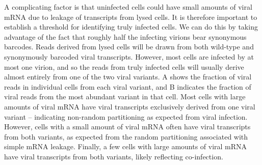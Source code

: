 \documentclass[9pt,lineno]{elife}
\begin{document}
A complicating factor is that uninfected cells could have small amounts of viral mRNA due to leakage of transcripts from lysed cells.
It is therefore important to establish a threshold for identifying truly infected cells.
We can do this by taking advantage of the fact that roughly half the infecting virions bear synonymous barcodes.
Reads derived from lysed cells will be drawn from both wild-type and synonymously barcoded viral transcripts.
However, most cells are infected by at most one virion, and so the reads from truly infected cells will usually derive almost entirely from one of the two viral variants. 
A shows the fraction of viral reads in individual cells from each viral variant, and B indicates the fraction of viral reads from the most abundant variant in that cell.
Most cells with large amounts of viral mRNA have viral transcripts exclusively derived from one viral variant -- indicating non-random partitioning as expected from viral infection.
However, cells with a small amount of viral mRNA often have viral transcripts from both variants, as expected from the random partitioning associated with simple mRNA leakage.
Finally, a few cells with large amounts of viral mRNA have viral transcripts from both variants, likely reflecting co-infection.
\end{document}
